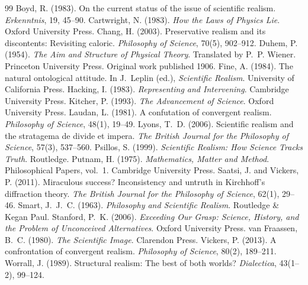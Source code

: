 \documentclass{situationist-preprint}
\begin{document}
\begin{thebibliography}{99}\small
{} Boyd, R. (1983). On the current status of the issue of scientific realism. \emph{Erkenntnis}, 19, 45--90.
 Cartwright, N. (1983). \emph{How the Laws of Physics Lie}. Oxford University Press.
 Chang, H. (2003). Preservative realism and its discontents: Revisiting caloric. \emph{Philosophy of Science}, 70(5), 902--912.
 Duhem, P. (1954). \emph{The Aim and Structure of Physical Theory}. Translated by P.~P. Wiener. Princeton University Press. Original work published 1906.
 Fine, A. (1984). The natural ontological attitude. In J.~Leplin (ed.), \emph{Scientific Realism}. University of California Press.
 Hacking, I. (1983). \emph{Representing and Intervening}. Cambridge University Press.
 Kitcher, P. (1993). \emph{The Advancement of Science}. Oxford University Press.
 Laudan, L. (1981). A confutation of convergent realism. \emph{Philosophy of Science}, 48(1), 19--49.
 Lyons, T.~D. (2006). Scientific realism and the stratagema de divide et impera. \emph{The British Journal for the Philosophy of Science}, 57(3), 537--560.
 Psillos, S. (1999). \emph{Scientific Realism: How Science Tracks Truth}. Routledge.
 Putnam, H. (1975). \emph{Mathematics, Matter and Method}. Philosophical Papers, vol.~1. Cambridge University Press.
 Saatsi, J. and Vickers, P. (2011). Miraculous success? Inconsistency and untruth in Kirchhoff's diffraction theory. \emph{The British Journal for the Philosophy of Science}, 62(1), 29--46.
 Smart, J.~J.~C. (1963). \emph{Philosophy and Scientific Realism}. Routledge \& Kegan Paul.
 Stanford, P.~K. (2006). \emph{Exceeding Our Grasp: Science, History, and the Problem of Unconceived Alternatives}. Oxford University Press.
 van Fraassen, B.~C. (1980). \emph{The Scientific Image}. Clarendon Press.
 Vickers, P. (2013). A confrontation of convergent realism. \emph{Philosophy of Science}, 80(2), 189--211.
 Worrall, J. (1989). Structural realism: The best of both worlds? \emph{Dialectica}, 43(1--2), 99--124.
\end{thebibliography}
\end{document}
